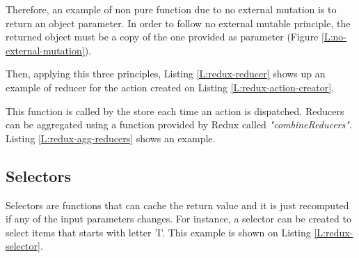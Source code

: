 \begin{codefigure}
\end{codefigure}

Therefore, an example of non pure function due to no external mutation is to
return an object parameter. In order to follow no external mutable principle,
the returned object must be a copy of the one provided as parameter (Figure
\ref{L:no-external-mutation}).

\begin{codefigure}
\end{codefigure}

Then, applying this three principles, Listing \ref{L:redux-reducer} shows up an
example of reducer for the action created on Listing 
\ref{L:redux-action-creator}.

\begin{codefigure}
\end{codefigure}

This function is called by the store each time an action is dispatched. 
Reducers can be aggregated using a function provided by Redux called
\textit{"combineReducers"}. Listing \ref{L:redux-agg-reducers} shows an example.

\begin{codefigure}
\end{codefigure}

\subsection{Selectors}
\label{S:selectors}

Selectors are functions that can cache the return value and it is just 
recomputed if any of the input parameters changes. For instance, a selector
can be created to select items that starts with letter 'I'. This example is
shown on Listing \ref{L:redux-selector}.

\begin{codefigure}
\end{codefigure}

